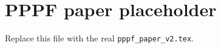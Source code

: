 \documentclass{article}
\begin{document}
\section*{PPPF paper placeholder}
Replace this file with the real \texttt{pppf\_paper\_v2.tex}.
\end{document}
